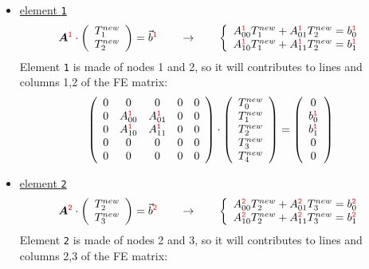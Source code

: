 \begin{itemize}
\item \underline{element {\color{red}\tt 1}} 
\[
{\bm A}^{\color{red} \tt 1}  \cdot 
\left(
\begin{array}{c}
T_1^{new} \\ T_2^{new}
\end{array}
\right)
 =  {\vec b}^{\color{red} \tt 1}
\qquad
\rightarrow
\qquad
\left\{ 
\begin{array}{l}
A_{00}^{{\color{red}\tt 1}} T_1^{new} + A_{01}^{{\color{red}\tt 1}} T_2^{new} = b^{{\color{red} \tt 1}}_0 \\
A_{10}^{{\color{red}\tt 1}} T_1^{new} + A_{11}^{{\color{red}\tt 1}} T_2^{new} = b^{{\color{red} \tt 1}}_1
\end{array}
\right.
\]
Element {\color{red}\tt 1} is made of nodes 1 and 2, so it will contributes to lines and columns 1,2 of the FE matrix:
\[
\left( \begin{array}{ccccc}
0 & 0 & 0 & 0 & 0 \\ 
0 & A_{00}^{{\color{red}\tt 1}} &  A_{01}^{{\color{red}\tt 1}} &0&0 \\ 
0 & A_{10}^{{\color{red}\tt 1}} &  A_{11}^{{\color{red}\tt 1}}    &0&0 \\
0 & 0 & 0 & 0 & 0 \\ 
0 & 0 & 0 & 0 & 0 
\end{array} \right) \cdot
\left(\begin{array}{c}
T_0^{new} \\ T_1^{new} \\ T_2^{new} \\ T_3^{new} \\ T_4^{new}
\end{array} \right)
=
\left(\begin{array}{c}
0 \\ b_{0}^{{\color{red}\tt 1}} \\  b_{1}^{{\color{red}\tt 1}} \\  0 \\  0 
\end{array}\right)
\]



\item \underline{element {\color{red}\tt 2}}
\[
{\bm A}^{\color{red} \tt 2}  \cdot 
\left(
\begin{array}{c}
T_2^{new} \\ T_3^{new}
\end{array}
\right)
 =  {\vec b}^{\color{red} \tt 2}
\qquad
\rightarrow
\qquad
\left\{ 
\begin{array}{l}
A_{00}^{{\color{red}\tt 2}} T_2^{new} + A_{01}^{{\color{red} \tt 2}} T_3^{new} = b^{{\color{red} \tt 2}}_0 \\
A_{10}^{{\color{red}\tt 2}} T_2^{new} + A_{11}^{{\color{red} \tt 2}} T_3^{new} = b^{{\color{red} \tt 2}}_1
\end{array}
\right.
\]
Element {\color{red}\tt 2} is made of nodes 2 and 3, so it will contributes to lines and columns 2,3 of the FE matrix:


\end{itemize}
